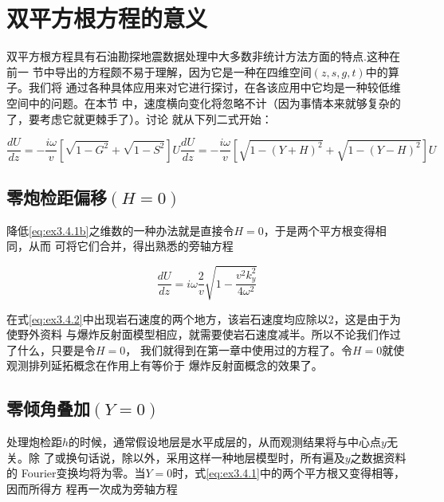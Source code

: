 \section{双平方根方程的意义}
\label{sec:3.4}

双平方根方程具有石油勘探地震数据处理中大多数非统计方法方面的特点.这种在前一
节中导出的方程颇不易于理解，因为它是一种在四维空间$(z,s,g,t)$中的算子。我们将
通过各种具体应用来对它进行探讨，在各该应用中它均是一种较低维空间中的问题。在本节
中，速度横向变化将忽略不计（因为事情本来就够复杂的了，要考虑它就更棘手了）。讨论
就从下列二式开始：

\begin{subequations}
\begin{equation}
\frac{dU}{dz}=-\frac{i\omega}{v}[\sqrt{1-G^2}+\sqrt{1-S^2}]U
\label{eq:ex3.4.1a}
\end{equation}
\begin{equation}
\frac{dU}{dz}=-\frac{i\omega}{v}[\sqrt{1-(Y+H)^2}+\sqrt{1-(Y-H)^2}]U
\label{eq:ex3.4.1b}
\end{equation}
\label{eq:ex3.4.1}
\end{subequations}

\subsection{零炮检距偏移$(H=0)$}
\label{sec:3.4.1}

降低\ref{eq:ex3.4.1b}之维数的一种办法就是直接令$H=0$，于是两个平方根变得相同，从而
可将它们合并，得出熟悉的旁轴方程

\begin{equation}
\frac{dU}{dz}=i\omega\frac{2}{v}\sqrt{1-\frac{v^2k_y^2}{4\omega^2}}
\label{eq:ex3.4.2}
\end{equation}

在式\ref{eq:ex3.4.2}中出现岩石速度的两个地方，该岩石速度均应除以2，这是由于为使野外资料
与爆炸反射面模型相应，就需要使岩石速度减半。所以不论我们作过了什么，只要是令$H=0$，
我们就得到在第一章中使用过的方程了。令$H=0$就使观测排列延拓概念在作用上有等价于
爆炸反射面概念的效果了。

\subsection{零倾角叠加$(Y=0)$}
\label{sec:3.4.2}

处理炮检距$h$的时候，通常假设地层是水平成层的，从而观测结果将与中心点$y$无关。除
了或换句话说，除以外，采用这样一种地层模型时，所有遍及$y$之数据资料的
Fourier变换均将为零。当$Y=0$时，式\ref{eq:ex3.4.1}中的两个平方根又变得相等，因而所得方
程再一次成为旁轴方程


